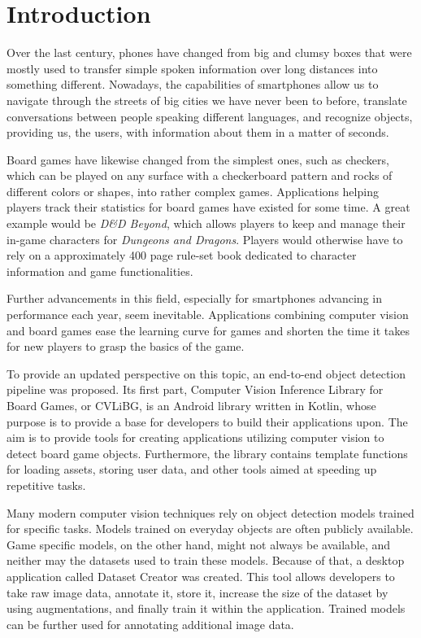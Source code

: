 \chapter{Introduction}
Over the last century, phones have changed from big and clumsy boxes that were mostly used to transfer simple spoken information over long distances into something different. Nowadays, the capabilities of smartphones allow us to navigate through the streets of big cities we have never been to before, translate conversations between people speaking different languages,
and recognize objects, providing us, the users, with information about them in a matter of seconds.

Board games have likewise changed from the simplest ones, such as checkers, which can be played on any surface with a checkerboard pattern and rocks of different colors or shapes, into rather complex games. Applications helping players track their statistics for board games have existed for some time. A great example would be \textit{D\&D Beyond}, which allows players to keep and manage their in-game characters for \textit{Dungeons and Dragons}. Players would otherwise have to rely on a approximately 400 page rule-set book dedicated to character information and game functionalities. 

Further advancements in this field, especially for smartphones advancing in performance each year, seem inevitable. Applications combining computer vision and board games ease the learning curve for games and shorten the time it takes for new players to grasp the basics of the game.

To provide an updated perspective on this topic, an end-to-end object detection pipeline was proposed. Its first part, Computer Vision Inference Library for Board Games, or CVLiBG, is an Android library written in Kotlin, whose purpose is to provide a base for developers to build their applications upon. The aim is to provide tools for creating applications utilizing computer vision to detect board game objects. Furthermore, the library contains template functions for loading assets, storing user data, and other tools aimed at speeding up repetitive tasks.

Many modern computer vision techniques rely on object detection models trained for specific tasks. Models trained on everyday objects are often publicly available. Game specific models, on the other hand, might not always be available, and neither may the datasets used to train these models. Because of that, a desktop application called Dataset Creator was created. This tool allows developers to take raw image data, annotate it, store it, increase the size of the dataset by using augmentations, and finally train it within the application. Trained models can be further used for annotating additional image data.

